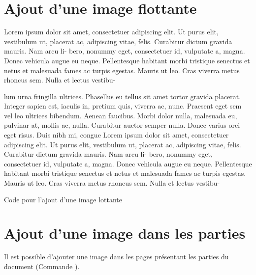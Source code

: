 \section{Ajout d'une image flottante}

Lorem ipsum dolor sit amet, consectetuer adipiscing elit. Ut purus elit, vestibulum
ut, placerat ac, adipiscing vitae, felis. Curabitur dictum gravida mauris. Nam arcu li-
bero, nonummy eget, consectetuer id, vulputate a, magna. Donec vehicula augue eu
neque. Pellentesque habitant morbi tristique senectus et netus et malesuada fames ac
turpis egestas. Mauris ut leo. Cras viverra metus rhoncus sem. Nulla et lectus vestibu-


lum urna fringilla ultrices. Phasellus eu tellus sit amet tortor gravida placerat. Integer
sapien est, iaculis in, pretium quis, viverra ac, nunc. Praesent eget sem vel leo ultrices
bibendum. Aenean faucibus. Morbi dolor nulla, malesuada eu, pulvinar at, mollis ac,
nulla. Curabitur auctor semper nulla. Donec varius orci eget risus. Duis nibh mi, congue
Lorem ipsum dolor sit amet, consectetuer adipiscing elit. Ut purus elit, vestibulum
ut, placerat ac, adipiscing vitae, felis. Curabitur dictum gravida mauris. Nam arcu li-
bero, nonummy eget, consectetuer id, vulputate a, magna. Donec vehicula augue eu
neque. Pellentesque habitant morbi tristique senectus et netus et malesuada fames ac
turpis egestas. Mauris ut leo. Cras viverra metus rhoncus sem. Nulla et lectus vestibu-


\begin{Latex}{Code pour l'ajout d'une image lottante}
\end{Latex}


\section{Ajout d'une image dans les parties}

Il est possible d'ajouter une image dans les pages présentant les parties du document (Commande ).



